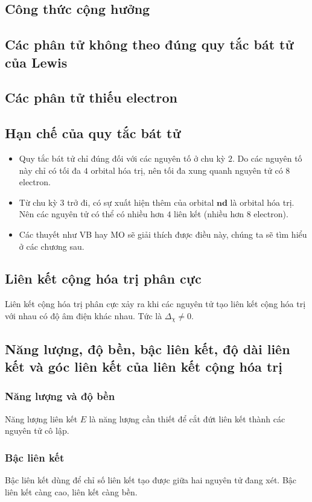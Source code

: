 \subsection{Công thức cộng hưởng}
\subsection{Các phân tử không theo đúng quy tắc bát tử của Lewis}
\subsection{Các phân tử thiếu electron}
\subsection{Hạn chế của quy tắc bát tử}
\begin{itemize}
\item Quy tắc bát tử chỉ đúng đối với các nguyên tố ở chu kỳ $2.$ Do các nguyên tố này chỉ có tối đa $4$ orbital hóa trị, nên tối đa xung quanh nguyên tử có $8$ electron.
\item Từ chu kỳ $3$ trở đi, có sự xuất hiện thêm của orbital $\mathbf{nd}$ là orbital hóa trị. Nên các nguyên tử có thể có nhiều hơn $4$ liên kết (nhiều hơn $8$ electron).
\item Các thuyết như VB hay MO sẽ giải thích được điều này, chúng ta sẽ tìm hiểu ở các chương sau.
\end{itemize}
\subsection{Liên kết cộng hóa trị phân cực}
Liên kết cộng hóa trị phân cực xảy ra khi các nguyên tử tạo liên kết cộng hóa trị với nhau có độ âm điện khác nhau. Tức là ${\Delta _\chi } \ne 0.$
\subsection{Năng lượng, độ bền, bậc liên kết, độ dài liên kết và góc liên kết của liên kết cộng hóa trị}
\subsubsection{Năng lượng và độ bền}
Năng lượng liên kết $E$ là năng lượng cần thiết để cắt đứt liên kết thành các nguyên tử cô lập.
\subsubsection{Bậc liên kết}
Bậc liên kết dùng để chỉ số liên kết tạo được giữa hai nguyên tử đang xét. Bậc liên kết càng cao, liên kết càng bền.
